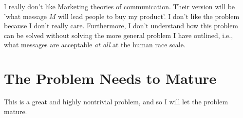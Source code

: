 \documentclass{amsart}
\begin{document}
I really don't like Marketing theories of communication.  Their version will be 'what message $M$ will lead people to buy my product'.  I don't like the problem because I don't really care.  Furthermore, I don't understand how this problem can be solved without solving the more general problem I have outlined, i.e., what messages are acceptable {\em at all} at the human race scale.

\section{The Problem Needs to Mature}

This is a great and highly nontrivial problem, and so I will let the problem mature.


 
\end{document}

